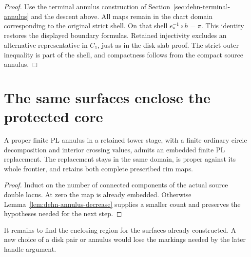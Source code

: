 \begin{proof}
Use the terminal annulus construction of
Section~\ref{sec:dehn-terminal-annulus} and the descent above.  All
maps remain in the chart domain corresponding to the original strict
shell.  On that shell $e_*^{-1}\circ h=\pi$.  This identity restores
the displayed boundary formulas.  Retained injectivity excludes an
alternative representative in $C_1$, just as in the disk-slab proof.
The strict outer inequality is part of the shell, and compactness
follows from the compact source annulus.
\end{proof}

\section{The same surfaces enclose the protected core}

\begin{theorem}
\label{thm:dehn-annulus-termination}
A proper finite PL annulus in a retained tower stage, with a finite
ordinary circle decomposition and interior crossing values, admits an
embedded finite PL replacement. The replacement stays in the same
domain, is proper against its whole frontier, and retains both complete
prescribed rim maps.
\end{theorem}

\begin{proof}
Induct on the number of connected components of the actual source
double locus. At zero the map is already embedded. Otherwise
Lemma~\ref{lem:dehn-annulus-decrease} supplies a smaller count and
preserves the hypotheses needed for the next step.
\end{proof}
\label{sec:dehn-enclosing-region}

It remains to find the enclosing region for the surfaces already
constructed.  A new choice of a disk pair or annulus would lose the
markings needed by the later handle argument.

